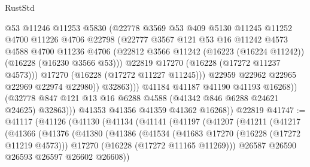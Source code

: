 \begin{lexlean}{RustStd}
\begin{coremodule}
                          @53
                          @11246
                          @11253
                          @5830
                          (@22778
                            @3569
                            @53
                            @409
                            @5130
                            @11245
                            @11252
                            @4700
                            @11226
                            @4706
                            @22798
                            (@22777
                              @3567
                              @121
                              @53
                              @16
                              @11242
                              @4573
                              @4588
                              @4700
                              @11236
                              @4706
                              (@22812
                                @3566
                                @11242
                                (@16223 (@16224 @11242))
                                (@16228 (@16230 @3566 @53)))
                              @22819
                              @17270
                              (@16228 (@17272 @11237 @4573)))
                            @17270
                            (@16228 (@17272 @11227 @11245)))
                          @22959
                          @22962
                          @22965
                          @22969
                          @22974
                          @22980))
                      @32863)))
                @41184
                @41187
                @41190
                @41193
                @16268))
            (@32778 @847 @121 @13 @16 @6288 @4588 (@41342 @846 @6288 @24621 @24625) @32863)))
        @41353
        @41356
        @41359
        @41362
        @16268))
    @22819
@41747 := @41117
    (@41126
      (@41130
        (@41134
          (@41141
            (@41197
              (@41207
                (@41211
                  (@41217
                    (@41366
                      (@41376
                        (@41380
                          (@41386
                            (@41534
                              (@41683 @17270 (@16228 (@17272 @11219 @4573)))
                              @17270
                              (@16228 (@17272 @11165 @11269)))
                            @26587
                            @26590
                            @26593
                            @26597
                            @26602
                            @26608))

\end{coremodule}
\end{lexlean}
